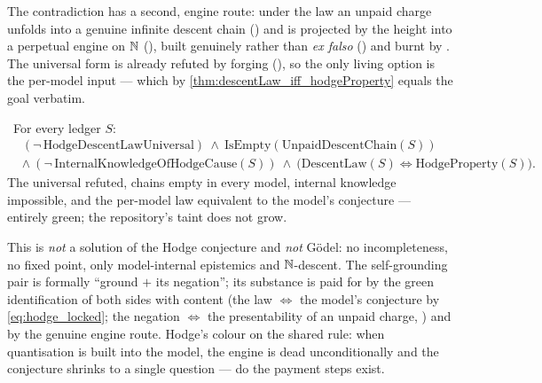 The contradiction has a second, engine route: under the law an unpaid charge unfolds into a genuine
infinite descent chain () and is projected by the height into
a perpetual engine on $\mathbb{N}$ (), built
genuinely rather than \emph{ex falso} () and burnt by
. The universal form is already refuted by forging
(), so the only living option is the per-model input --- which
by \cref{thm:descentLaw_iff_hodgeProperty} equals the goal verbatim.

\begin{theorem}\label{thm:hodge_locked_behind_engine_status}
\green{}\ For every ledger $S$:
\begin{equation}\label{eq:hodge_locked}
\begin{aligned}
  &(\neg\,\mathrm{HodgeDescentLawUniversal})\ \wedge\ \mathrm{IsEmpty}(\mathrm{UnpaidDescentChain}(S))\\
  &\wedge\ (\neg\,\mathrm{InternalKnowledgeOfHodgeCause}(S))\ \wedge\ \bigl(\mathrm{DescentLaw}(S)\iff\mathrm{HodgeProperty}(S)\bigr).
\end{aligned}
\end{equation}
The universal refuted, chains empty in every model, internal knowledge impossible, and the per-model
law equivalent to the model's conjecture --- entirely green; the repository's taint does not grow.
\end{theorem}

\begin{remark}
This is \emph{not} a solution of the Hodge conjecture and \emph{not} G\"odel: no incompleteness, no
fixed point, only model-internal epistemics and $\mathbb{N}$-descent. The self-grounding pair is formally
``ground $+$ its negation''; its substance is paid for by the green identification of both sides
with content (the law $\iff$ the model's conjecture by \cref{eq:hodge_locked}; the negation $\iff$
the presentability of an unpaid charge, ) and by the
genuine engine route. Hodge's colour on the shared rule: when quantisation is built into the model,
the engine is dead unconditionally and the conjecture shrinks to a single question --- do the payment
steps exist.
\end{remark}

